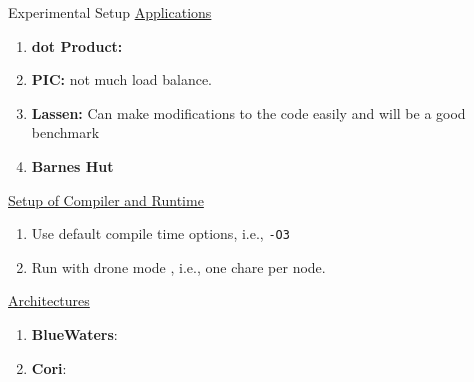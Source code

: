 
\begin{frame}{Experimental Setup}
   \underline{Applications}\\ 
   \begin{enumerate} 
   \item {\bf dot Product:}
   \item  {\bf PIC:} not much load balance.
  \item {\bf Lassen:} Can make modifications to the code easily and will be a good benchmark 
  \item {\bf Barnes Hut}
  \end{enumerate} 
  \underline{Setup of Compiler and Runtime}\\
  \begin{enumerate}
      \item Use default compile time options, i.e., {\tt -O3}
      \item Run with drone mode , i.e., one chare per node. 
  \end{enumerate} 
  \underline{Architectures} \\
  \begin{enumerate}
  \item \textbf{BlueWaters}:
  \item \textbf{Cori}:
  \end{enumerate} 
\end{frame}


